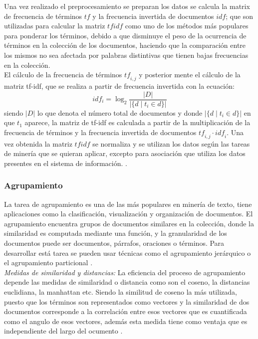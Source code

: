 Una vez realizado el preprocesamiento se preparan los datos se calcula la matrix de frecuencia de términos $tf$ y la frecuencia invertida de documentos $idf$; que son utilizadas para calcular la matriz $tfidf$ como uno de los métodos más populares para ponderar los términos, debido a que disminuye el peso de la ocurrencia de términos en la colección de los documentos, haciendo que la comparación entre los mismos no sea afectada por palabras distintivas que tienen bajas frecuencias en la colección\cite{Renganathan2017,Allahyari2017}. \\

El cálculo de la frecuencia de términos $\mathit{tf}_{i,j}$ y posterior mente el cálculo de la matriz tf-idf, que se realiza a partir de frecuencia invertida con la ecuación: 
$${idf}_i = \log_2 \frac{|D|}{|\{d \mid t_i \in d\}|}$$
siendo $|D|$ lo que denota el número total de documentos y donde $|\{d\mid t_i \in d\}|$ en  que $t_1$ aparece, la matriz de tf-idf es calculada a partir de la multiplicación de la frecuencia de términos y la frecuencia invertida de documentos $\mathit{tf}_{i,j} \cdot \mathit{idf}_i$. Una vez obtenida la matriz $tfidf$ se normaliza y se utilizan los datos según las tareas de minería que se quieran aplicar, excepto para asociación que utiliza los datos presentes en el sistema de información. \cite{Buckley1988,VishalGupta2009}.

\subsubsection{Agrupamiento}

La tarea de agrupamiento es una de las más populares en minería de texto, tiene aplicaciones como la clasificación, visualización y organización de documentos. El agrupamiento encuentra grupos de documentos similares en la colección, donde la similaridad es computada mediante una función, y la granularidad de los documentos puede ser documentos, párrafos, oraciones o términos. Para desarrollar está tarea se pueden usar técnicas como el agrupamiento jerárquico o el agrupamiento particional \cite{Renganathan2017,Allahyari2017}.\\

\textit{Medidas de similaridad y distancias:} La eficiencia del proceso de agrupamiento depende las medidas de similaridad o distancia como son el coseno, la distancias euclidiana, la manhattan etc. Siendo la similitud de coseno la más utilizada, puesto que los términos son representados como vectores y la similaridad de dos documentos corresponde a la correlación entre esos vectores que es cuantificada como el angulo de esos vectores, además esta medida tiene como ventaja que es independiente del largo del ocumento \cite{Renganathan2017,Huang2008}.\\


